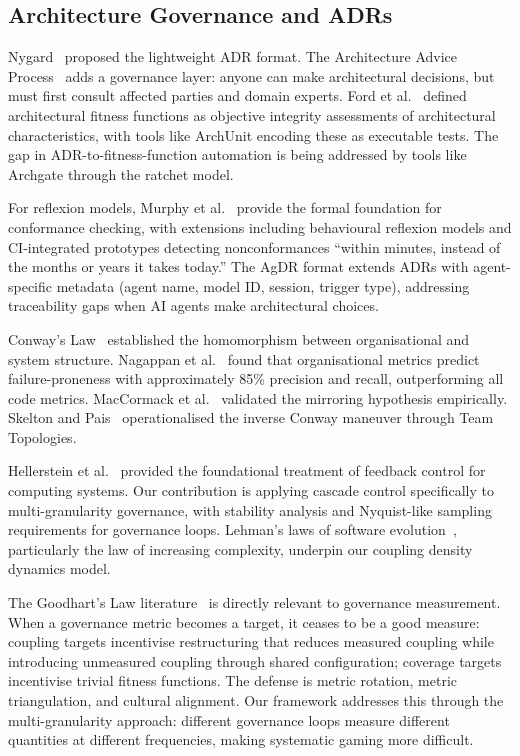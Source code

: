 \documentclass[11pt, a4paper, logo, copyright]{googledeepmind}
\begin{document}
\subsection{Architecture Governance and ADRs}

Nygard~\citep{nygard2011} proposed the lightweight ADR format. The Architecture Advice Process~\citep{harmellaw2023} adds a governance layer: anyone can make architectural decisions, but must first consult affected parties and domain experts. Ford et al.~\citep{ford2017} defined architectural fitness functions as objective integrity assessments of architectural characteristics, with tools like ArchUnit encoding these as executable tests. The gap in ADR-to-fitness-function automation is being addressed by tools like Archgate through the ratchet model.

For reflexion models, Murphy et al.~\citep{murphy1995, murphy2001} provide the formal foundation for conformance checking, with extensions including behavioural reflexion models and CI-integrated prototypes detecting nonconformances ``within minutes, instead of the months or years it takes today.'' The AgDR format extends ADRs with agent-specific metadata (agent name, model ID, session, trigger type), addressing traceability gaps when AI agents make architectural choices.

Conway's Law~\citep{conway1968} established the homomorphism between organisational and system structure. Nagappan et al.~\citep{nagappan2008} found that organisational metrics predict failure-proneness with approximately 85\% precision and recall, outperforming all code metrics. MacCormack et al.~\citep{maccormack2008} validated the mirroring hypothesis empirically. Skelton and Pais~\citep{skelton2019} operationalised the inverse Conway maneuver through Team Topologies.

Hellerstein et al.~\citep{hellerstein2004} provided the foundational treatment of feedback control for computing systems. Our contribution is applying cascade control specifically to multi-granularity governance, with stability analysis and Nyquist-like sampling requirements for governance loops. Lehman's laws of software evolution~\citep{Lehman1980}, particularly the law of increasing complexity, underpin our coupling density dynamics model.

The Goodhart's Law literature~\citep{goodhart1975, manheim2019goodhart} is directly relevant to governance measurement. When a governance metric becomes a target, it ceases to be a good measure: coupling targets incentivise restructuring that reduces measured coupling while introducing unmeasured coupling through shared configuration; coverage targets incentivise trivial fitness functions. The defense is metric rotation, metric triangulation, and cultural alignment. Our framework addresses this through the multi-granularity approach: different governance loops measure different quantities at different frequencies, making systematic gaming more difficult.
\end{document}
